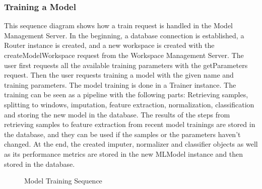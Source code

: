\subsubsection{Training a Model}
This sequence diagram shows how a train request is handled in the Model Management Server. In the beginning, a database connection is established, a Router instance is created, and a new workspace is created with the createModelWorkspace request from the Workspace Management Server.
The user first requests all the available training parameters with the getParameters request. Then the user requests training a model with the given name and training parameters. The model training is done in a Trainer instance. The training can be seen as a pipeline with the following parts: Retrieving samples, splitting to windows, imputation, feature extraction, normalization, classification and storing the new model in the database. The results of the steps from retrieving samples to feature extraction from recent model trainings are stored in the database, and they can be used if the samples or the parameters haven't changed. At the end, the created imputer, normalizer and classifier objects as well as its performance metrics are stored in the new MLModel instance and then stored in the database.
\newpage
\begin{figure}[!htb]
    \centering
    \caption{Model Training Sequence}
    \label{fig:seq-training-a-model}
\end{figure}



